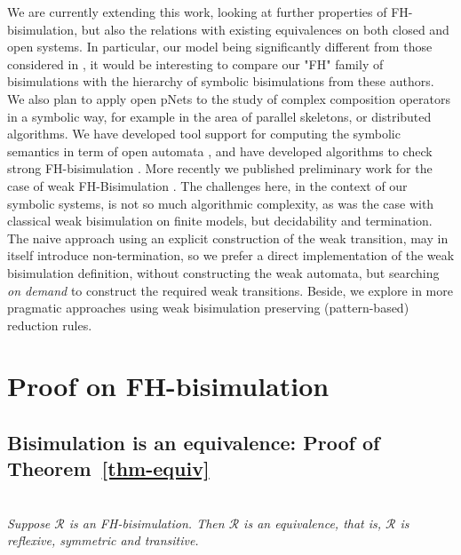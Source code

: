 \documentclass{lmcs}
\begin{document}
We are currently extending this work,  looking at further properties of FH-bisimulation, but also
the relations with existing equivalences on both closed and open systems. In particular, our model being significantly different from those considered in \cite{IngolfsdottirL:2001}, it
would be interesting to compare our "FH" family of bisimulations with the hierarchy of symbolic bisimulations from these authors.
We also plan to apply open pNets to the study of complex composition
operators in a symbolic way, for example in the area of parallel
skeletons, or distributed algorithms.
We have developed tool support for computing the
symbolic semantics in term of open automata \cite{QBMZ-AVOCS18}, and have
developed algorithms to check strong FH-bisimulation \cite{hou:hal-02406098}.
More recently we published preliminary work for the case of weak FH-Bisimulation \cite{}. 
The challenges here, in the context of our symbolic systems, is not so much algorithmic complexity,
as was the case with classical weak bisimulation on finite models, but decidability and termination.
The naive approach using an explicit construction of the weak transition, may in itself introduce non-termination,
so we prefer a direct implementation of the weak bisimulation definition, without
constructing the weak automata, but searching \emph{on demand} to construct the required weak transitions.
Beside, we explore in \cite{wang:hal-03126313} more pragmatic approaches using weak bisimulation preserving (pattern-based) 
reduction rules.





% 


\newpage
\appendix    
\section{Proof on FH-bisimulation}
\subsection{Bisimulation is an equivalence: Proof of Theorem~\ref{thm-equiv}}\label{thm-equiv-proof}~\\
        \emph{Suppose $\mathcal{R}$ 
       	is an FH-bisimulation. Then $\mathcal{R}$ is an equivalence, that is, 
       	$\mathcal{R}$ is 
       	reflexive, symmetric and transitive.
       	}
       
\end{document}
